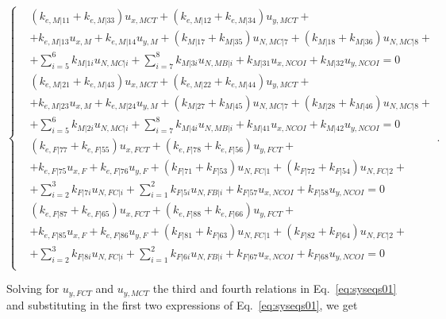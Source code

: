 \documentclass[review]{elsarticle}
\begin{document}
\begin{equation}\label{eq:syseqs01}
\begin{cases}
&\left(k_{e,M|11}+k_{e,M|33}\right)u_{x,MCT}+\left(k_{e,M|12}+k_{e,M|34}\right)u_{y,MCT}+\\&+k_{e,M|13}u_{x,M}+k_{e,M|14}u_{y,M}+\left(k_{M|17}+k_{M|35}\right)u_{N,MC|7}+\left(k_{M|18}+k_{M|36}\right)u_{N,MC|8}+\\&+\sum_{i=5}^{6}k_{M|1i}u_{N,MC|i}+\sum_{i=7}^{8}k_{M|3i}u_{N,MB|i}+k_{M|31}u_{x,NCOI}+k_{M|32}u_{y,NCOI}=0\\[10pt]
&\left(k_{e,M|21}+k_{e,M|43}\right)u_{x,MCT}+\left(k_{e,M|22}+k_{e,M|44}\right)u_{y,MCT}+\\&+k_{e,M|23}u_{x,M}+k_{e,M|24}u_{y,M}+\left(k_{M|27}+k_{M|45}\right)u_{N,MC|7}+\left(k_{M|28}+k_{M|46}\right)u_{N,MC|8}+\\&+\sum_{i=5}^{6}k_{M|2i}u_{N,MC|i}+\sum_{i=7}^{8}k_{M|4i}u_{N,MB|i}+k_{M|41}u_{x,NCOI}+k_{M|42}u_{y,NCOI}=0\\[10pt]
&\left(k_{e,F|77}+k_{e,F|55}\right)u_{x,FCT}+\left(k_{e,F|78}+k_{e,F|56}\right)u_{y,FCT}+\\&+k_{e,F|75}u_{x,F}+k_{e,F|76}u_{y,F}+\left(k_{F|71}+k_{F|53}\right)u_{N,FC|1}+\left(k_{F|72}+k_{F|54}\right)u_{N,FC|2}+\\&+\sum_{i=2}^{3}k_{F|7i}u_{N,FC|i}+\sum_{i=1}^{2}k_{F|5i}u_{N,FB|i}+k_{F|57}u_{x,NCOI}+k_{F|58}u_{y,NCOI}=0\\[10pt]
&\left(k_{e,F|87}+k_{e,F|65}\right)u_{x,FCT}+\left(k_{e,F|88}+k_{e,F|66}\right)u_{y,FCT}+\\&+k_{e,F|85}u_{x,F}+k_{e,F|86}u_{y,F}+\left(k_{F|81}+k_{F|63}\right)u_{N,FC|1}+\left(k_{F|82}+k_{F|64}\right)u_{N,FC|2}+\\&+\sum_{i=2}^{3}k_{F|8i}u_{N,FC|i}+\sum_{i=1}^{2}k_{F|6i}u_{N,FB|i}+k_{F|67}u_{x,NCOI}+k_{F|68}u_{y,NCOI}=0\\[10pt]
\end{cases}.
\end{equation}

Solving for $u_{y,FCT}$ and $u_{y,MCT}$ the third and fourth relations in Eq.~\ref{eq:syseqs01} and substituting in the first two expressions of Eq.~\ref{eq:syseqs01}, we get
\end{document}
